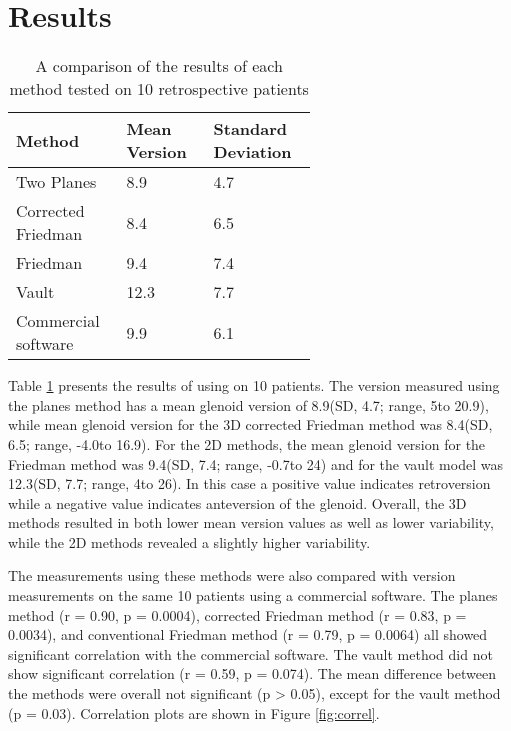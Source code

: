 \section{Results}
\label{sec:results}
\begin{table}
	\begin{center}
		\begin{tabular}{|p{0.2\linewidth}|p{0.2\linewidth}|p{0.2\linewidth}|} \hline
			Method & Mean Version & Standard Deviation \\ \hline
			Two Planes & 8.9\degree & 4.7\degree \\
			Corrected Friedman & 8.4\degree & 6.5\degree \\
			Friedman & 9.4\degree & 7.4\degree \\
			Vault & 12.3\degree & 7.7\degree \\
			Commercial software & 9.9\degree & 6.1\degree \\
                        \hline
		\end{tabular}
	\end{center}
	\caption{\label{tab:results}A comparison of the results of each method tested 
	on 10 retrospective patients}
\end{table}

Table \ref{tab:results} presents the results of using \sksglenoid on 10 patients.
The version measured using the planes method has a mean glenoid
version of 8.9\degree (SD, 4.7\degree; range, 5\degree to 20.9\degree), 
while mean glenoid version 
for the 3D corrected Friedman method 
was 8.4\degree (SD, 6.5\degree; range, -4.0\degree to 16.9\degree). 
For the 2D methods, the mean glenoid version for the 
Friedman method was 9.4\degree (SD, 7.4\degree; range, -0.7\degree to 24\degree) 
and for the vault model was 12.3\degree (SD, 7.7\degree; range, 4\degree to 26\degree).
In this 
case a positive value indicates retroversion while a negative value indicates anteversion of the 
glenoid. Overall, the 3D methods resulted in both lower mean version values as well as lower
variability, while the 2D methods revealed a slightly higher variability.

The measurements using these methods were also compared with version measurements on the same
10 patients using a commercial software\cite{djosurgical}. 
The planes method (r = 0.90, p = 0.0004), 
corrected Friedman method (r = 0.83, p = 0.0034), 
and conventional Friedman method (r = 0.79, p = 0.0064) 
all showed significant correlation with the commercial software. 
The vault method did not show significant correlation (r = 0.59, p = 0.074).  
The mean difference between the methods were overall not significant (p > 0.05), 
except for the vault method (p = 0.03). Correlation plots are shown in Figure \ref{fig:correl}.
